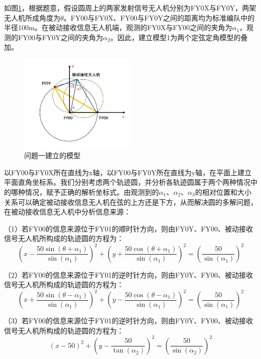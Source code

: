 \documentclass{my_paper}
\begin{document}
如图\ref{moxing1}，根据题意，假设圆周上的两家发射信号无人机分别为FY0X与FY0Y，两架无人机所成角度为$\theta$。FY00与FY0X、FY00与FY0Y之间的距离均为标准编队中的半径100m。在被动接收信息无人机端，观测的FY0X与FY00之间的夹角为$\alpha_1$，观测的FY00与FY0Y之间的夹角为$\alpha_2$。因此，建立模型1为两个定弦定角模型的叠加。



\begin{figure}[h]
    \centering
    \includegraphics[width=0.5\textwidth]{images/yuan.jpg}
    \caption{问题一建立的模型}
    \label{moxing1}
\end{figure}

以FY00与FY0X所在直线为x轴，以FY00与FY0Y所在直线为y轴，在平面上建立平面直角坐标系。我们分别考虑两个轨迹圆，并分析各轨迹圆属于两个两种情况中的哪种情况，赋予正确的解析坐标式。由观测到的$\alpha_1$、$\alpha_2$、$\alpha_3$的相对位置和大小关系可以确定被动接收信息无人机在弦的上方还是下方，从而解决圆的多解问题，在被动接收信息无人机中分析信息来源：

（1）若FY00的信息来源位于FY01的顺时针方向，则由FY0Y、FY00、被动接收信号无人机所构成的轨迹圆的方程为：
\begin{equation}
    (x - \frac{50\sin(\theta + \alpha_1)}{\sin(\alpha_1)})^2 + (y + \frac{50\cos(\theta + \alpha_1)}{\sin(\alpha_1)})^2 = (\frac{50}{\sin(\alpha_1)}) ^ 2
    \label{yuan1}
\end{equation}

（2）若FY00的信息来源位于FY01的逆时针方向，则由FY0Y、FY00、被动接收信号无人机所构成的轨迹圆的方程为：
\begin{equation}
    (x + \frac{50\sin(\theta - \alpha_1)}{\sin(\alpha_1)})^2 + (y - \frac{50\cos(\theta - \alpha_1)}{\sin(\alpha_1)})^2 = (\frac{50}{\sin(\alpha_1)}) ^ 2
    \label{yuan2}
\end{equation}

（3）若FY00的信息来源位于FY01的逆时针方向，则由FY0Y、FY00、被动接收信号无人机所构成的轨迹圆的方程为：
\begin{equation}
    (x - 50) ^{2} + (y - \frac{50}{\tan(\alpha_{2})}) ^ {2} = (\frac{50}{\sin(\alpha_2)}) ^ 2
    \label{yuan3}
\end{equation}
\end{document}
